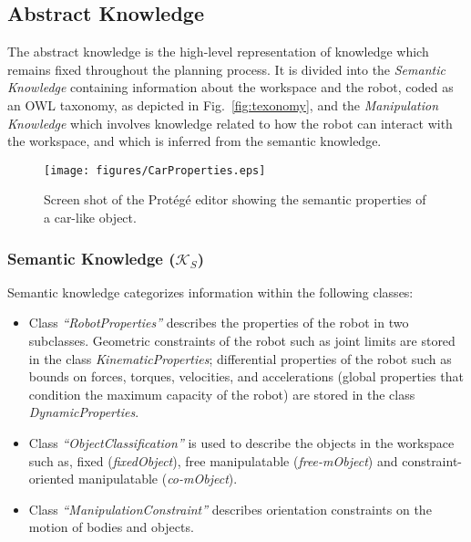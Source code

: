 \documentclass[twocolumn]{svjour3}          %
\begin{document}
\subsection{Abstract Knowledge}

The abstract knowledge is the high-level representation of knowledge which remains fixed throughout the planning process. It is divided into the \textit{Semantic Knowledge} containing information 
about the workspace and the robot, coded as an OWL taxonomy, as depicted in Fig.~\ref{fig:texonomy}, and the \textit{Manipulation Knowledge} which involves knowledge related to how the robot can 
interact with the workspace, and which is inferred from the semantic knowledge. 

\begin{figure}[h]
\begin{center}
   \texttt{[image: figures/CarProperties.eps]}
   \caption{Screen shot of the Prot\'eg\'e editor showing the semantic properties of a car-like object.}\label{fig:semanticprop}
\end{center}
\end{figure}

\subsubsection{Semantic Knowledge ($\mathcal{K}_S$)}\label{sec:semKnowledge}
 Semantic knowledge categorizes information within the following classes:

\begin{itemize}
  \item Class \textit{``RobotProperties''} describes the properties of the robot in two subclasses. Geometric constraints of the robot such as joint limits are stored in the class 
\textit{KinematicProperties}; differential properties of the robot such as bounds on forces, torques, velocities, and accelerations (global properties that condition the maximum capacity of the robot) 
are stored in the class \textit{DynamicProperties}.
  \item Class \textit{``ObjectClassification''} is used to describe the objects in the workspace such as, fixed 
(\textit{fixedObject}), free manipulatable (\textit{free-mObject}) and constraint-oriented manipulatable (\textit{co-mObject}).

  \item Class \textit{``ManipulationConstraint''} describes orientation constraints on the motion of bodies and objects.
 
\end{itemize}
\end{document}
